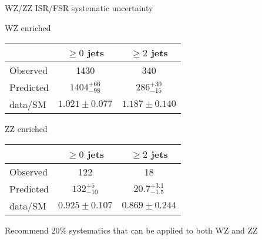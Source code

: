 \documentclass[10pt]{beamer}
\begin{document}
\begin{frame}{WZ/ZZ ISR/FSR systematic uncertainty}
\begin{block}{WZ enriched}
  
\begin{table}
\begin{center} 
\begin{tabular}{l|c|c}
\hline \hline
     & $\ge 0$ jets & $\ge 2$ jets  \\ 
\hline
Observed & 1430 &  340 \\
\hline
Predicted  & $1404^{+66}_{-98} $ & $286^{+30}_{-15} $  \\
\hline
data/SM & $1.021\pm0.077$ & $1.187\pm0.140$ \\
\hline \hline
\end{tabular}
\end{center}
\end{table}
\end{block}

\begin{block}{ZZ enriched}

\begin{table}
\begin{center} 
\begin{tabular}{l|c|c}
\hline \hline
     & $\ge 0$ jets & $\ge 2$ jets  \\ 
\hline
Observed & 122 &  18 \\
\hline
Predicted  & $132^{+5}_{-10} $ & $20.7^{+3.1}_{-1.5} $  \\
\hline
data/SM & $0.925\pm0.107$ & $0.869\pm0.244$ \\
\hline \hline
\end{tabular}
\end{center}
\end{table}
\end{block}

Recommend 20\% systematics that can be applied to both WZ and ZZ

\end{frame}





\end{document}
